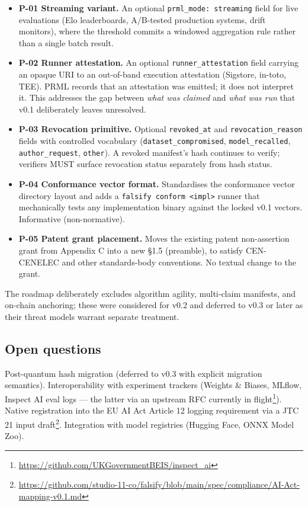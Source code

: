 \documentclass[11pt, a4paper]{article}
\begin{document}
\begin{itemize}[leftmargin=2em, itemsep=0.2em]
  \item \textbf{P-01 Streaming variant.} An optional \texttt{prml\_mode: streaming} field for live evaluations (Elo leaderboards, A/B-tested production systems, drift monitors), where the threshold commits a windowed aggregation rule rather than a single batch result.
  \item \textbf{P-02 Runner attestation.} An optional \texttt{runner\_attestation} field carrying an opaque URI to an out-of-band execution attestation (Sigstore, in-toto, TEE). PRML records that an attestation was emitted; it does not interpret it. This addresses the gap between \emph{what was claimed} and \emph{what was run} that v0.1 deliberately leaves unresolved.
  \item \textbf{P-03 Revocation primitive.} Optional \texttt{revoked\_at} and \texttt{revocation\_reason} fields with controlled vocabulary (\texttt{dataset\_compromised}, \texttt{model\_recalled}, \texttt{author\_request}, \texttt{other}). A revoked manifest's hash continues to verify; verifiers MUST surface revocation status separately from hash status.
  \item \textbf{P-04 Conformance vector format.} Standardises the conformance vector directory layout and adds a \texttt{falsify conform <impl>} runner that mechanically tests any implementation binary against the locked v0.1 vectors. Informative (non-normative).
  \item \textbf{P-05 Patent grant placement.} Moves the existing patent non-assertion grant from Appendix C into a new §1.5 (preamble), to satisfy CEN-CENELEC and other standards-body conventions. No textual change to the grant.
\end{itemize}

The roadmap deliberately excludes algorithm agility, multi-claim manifests, and on-chain anchoring; these were considered for v0.2 and deferred to v0.3 or later as their threat models warrant separate treatment.

\subsection{Open questions}

Post-quantum hash migration (deferred to v0.3 with explicit migration semantics). Interoperability with experiment trackers (Weights \& Biases, MLflow, Inspect AI eval logs --- the latter via an upstream RFC currently in flight\footnote{\url{https://github.com/UKGovernmentBEIS/inspect_ai}}). Native registration into the EU AI Act Article 12 logging requirement via a JTC 21 input draft\footnote{\url{https://github.com/studio-11-co/falsify/blob/main/spec/compliance/AI-Act-mapping-v0.1.md}}. Integration with model registries (Hugging Face, ONNX Model Zoo).
\end{document}
